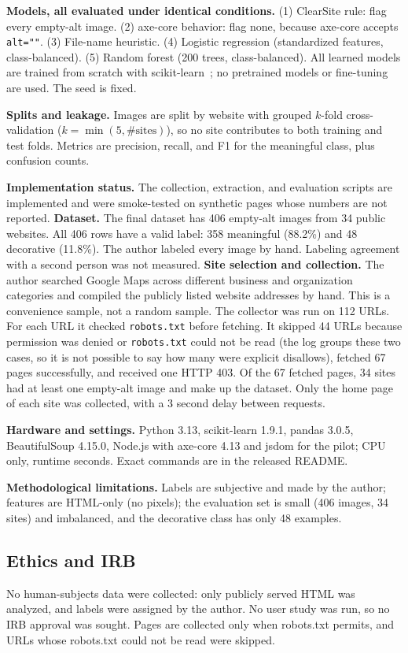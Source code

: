 \documentclass[sigconf,anonymous]{acmart}
\begin{document}
\textbf{Models, all evaluated under identical conditions.} (1) ClearSite rule: flag every empty-alt image. (2) axe-core behavior: flag none, because axe-core accepts \texttt{alt=""}. (3) File-name heuristic. (4) Logistic regression (standardized features, class-balanced). (5) Random forest (200 trees, class-balanced). All learned models are trained from scratch with scikit-learn~\cite{scikit-learn}; no pretrained models or fine-tuning are used. The seed is fixed.

\textbf{Splits and leakage.} Images are split by website with grouped $k$-fold cross-validation ($k=\min(5,\#\text{sites})$), so no site contributes to both training and test folds. Metrics are precision, recall, and F1 for the meaningful class, plus confusion counts.

\textbf{Implementation status.} The collection, extraction, and evaluation scripts are implemented and were smoke-tested on synthetic pages whose numbers are not reported. \textbf{Dataset.} The final dataset has 406 empty-alt images from 34 public websites. All 406 rows have a valid label: 358 meaningful (88.2\%) and 48 decorative (11.8\%). The author labeled every image by hand. Labeling agreement with a second person was not measured. \textbf{Site selection and collection.} The author searched Google Maps across different business and organization categories and compiled the publicly listed website addresses by hand. This is a convenience sample, not a random sample. The collector was run on 112 URLs. For each URL it checked \texttt{robots.txt} before fetching. It skipped 44 URLs because permission was denied or \texttt{robots.txt} could not be read (the log groups these two cases, so it is not possible to say how many were explicit disallows), fetched 67 pages successfully, and received one HTTP 403. Of the 67 fetched pages, 34 sites had at least one empty-alt image and make up the dataset. Only the home page of each site was collected, with a 3 second delay between requests.

\textbf{Hardware and settings.} Python 3.13, scikit-learn 1.9.1, pandas 3.0.5, BeautifulSoup 4.15.0, Node.js with axe-core 4.13 and jsdom for the pilot; CPU only, runtime seconds. Exact commands are in the released README.

\textbf{Methodological limitations.} Labels are subjective and made by the author; features are HTML-only (no pixels); the evaluation set is small (406 images, 34 sites) and imbalanced, and the decorative class has only 48 examples.

\subsection{Ethics and IRB}
No human-subjects data were collected: only publicly served HTML was analyzed, and labels were assigned by the author. No user study was run, so no IRB approval was sought. Pages are collected only when robots.txt permits, and URLs whose robots.txt could not be read were skipped.
\end{document}
